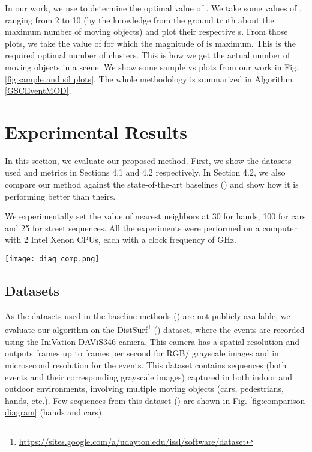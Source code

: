 \documentclass{article}
\begin{document}
In our work, we use  to determine the optimal value of . We take some values of , ranging from 2 to 10 (by the knowledge from the ground truth about the maximum number of moving objects) and plot their respective s. From those plots, we take the value of  for which the magnitude of  is maximum. This  is the required optimal number of clusters. This is how we get the actual number of moving objects in a scene. We show some sample  vs  plots from our work in Fig. \ref{fig:sample and sil plots}. The whole methodology is summarized in Algorithm \ref{GSCEventMOD}.


\section{Experimental Results}
In this section, we evaluate our proposed method. First, we show the datasets used and metrics in Sections 4.1 and 4.2 respectively. In Section 4.2, we also compare our method against the state-of-the-art baselines (\cite{pikatkowska2012spatiotemporal,chen2018neuromorphic,hinz2017online}) and show how it is performing better than theirs.

We experimentally set the value of nearest neighbors at 30 for hands, 100 for cars and 25 for street sequences. 
All the experiments were performed on a computer with 2 Intel\textsuperscript{\tiny\textregistered} Xenon\textsuperscript{\tiny\textregistered} CPUs, each with a clock frequency of  GHz.

\begin{figure*}
\begin{center}
\texttt{[image: diag\_comp.png]}
\end{center}
   \caption{Visual results for GSCEventMOD and other SOTA methods on the DistSurf (\cite{almatrafi2020distance}) (marked with ) and the synthetic dataset (marked with ). We show that our method performs significantly better than the other compared methods (best viewed in color).}
    \label{fig:comparison diagram}
\label{fig:comparison diagram}
\end{figure*}



\subsection{Datasets}

As the datasets used in the baseline methods (\cite{pikatkowska2012spatiotemporal,chen2018neuromorphic}) are not publicly available, we evaluate our algorithm on the DistSurf\footnote{\url{https://sites.google.com/a/udayton.edu/issl/software/dataset}} (\cite{almatrafi2020distance}) dataset, where the events are recorded using the IniVation DAViS346 camera. This camera has a  spatial resolution and outputs frames up to  frames per second for RGB/ grayscale images and in microsecond resolution for the events. This dataset contains sequences (both events and their corresponding grayscale images) captured in both indoor and outdoor environments, involving multiple moving objects (cars, pedestrians, hands, etc.). Few sequences from this dataset (\cite{almatrafi2020distance}) are shown in Fig. \ref{fig:comparison diagram} (hands and cars). 
\end{document}

